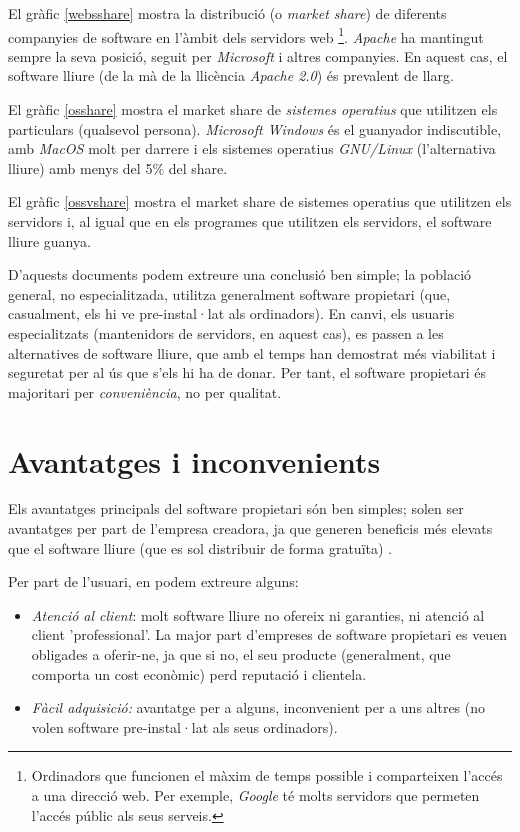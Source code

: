 	El gràfic \ref{websshare} mostra la distribució (o \emph{market share}) de diferents companyies de software
	en l'àmbit dels servidors web
	\footnote{Ordinadors que funcionen el màxim de temps possible i comparteixen l'accés a una direcció web.
	Per exemple, \emph{Google} té molts servidors que permeten l'accés públic als seus serveis.}.
	\emph{Apache}\cite{apache} ha mantingut sempre la seva posició,
	seguit per \emph{Microsoft} i altres companyies. En aquest cas, el software lliure (de la mà de la
	llicència \emph{Apache 2.0}\cite{apachelicense}) és prevalent de llarg.

	El gràfic \ref{osshare} mostra el market share de \emph{sistemes operatius} que utilitzen els particulars
	(qualsevol persona). \emph{Microsoft Windows} és el guanyador indiscutible, amb \emph{MacOS} molt per darrere
	i els sistemes operatius \emph{GNU/Linux} (l'alternativa lliure) amb menys del 5\% del share.

	El gràfic \ref{ossvshare} mostra el market share de sistemes operatius que utilitzen els servidors i,
	al igual que en els programes que utilitzen els servidors, el software lliure guanya.
	
	D'aquests documents podem extreure una conclusió ben simple; la població general, no especialitzada,
	utilitza generalment software propietari (que, casualment, els hi ve pre-instal·lat als ordinadors).
	En canvi, els usuaris especialitzats (mantenidors de servidors, en aquest cas), es passen a les alternatives
	de software lliure, que amb el temps han demostrat més viabilitat i seguretat per al ús que s'els hi ha de donar.
	Per tant, el software propietari és majoritari per \emph{conveniència}, no per qualitat.


\section{Avantatges i inconvenients}

Els avantatges principals del software propietari  són ben simples; solen ser avantatges per part
de l'empresa creadora, ja que generen beneficis més elevats que el software lliure (que es sol distribuir
de forma gratuïta) \cite{gentegeek}.

Per part de l'usuari, en podem extreure alguns:

\begin{itemize}
\item \emph{Atenció al client}: molt software lliure no ofereix ni garanties, ni atenció al client 'professional'.
La major part d'empreses de software propietari es veuen obligades a oferir-ne, ja que si no, el seu producte (generalment,
que comporta un cost econòmic) perd reputació i clientela.
\item \emph{Fàcil adquisició:} avantatge per a alguns, inconvenient per a uns altres (no volen software pre-instal·lat als seus
ordinadors).
\end{itemize}


